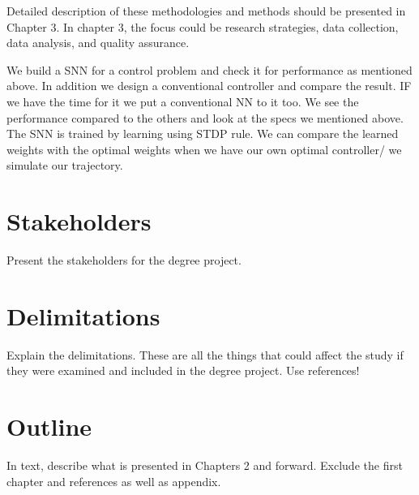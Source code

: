 Detailed description of these methodologies and methods should be presented in Chapter 3. In chapter 3, the focus could be research strategies, data collection, data analysis, and quality assurance.


We build a SNN for a control problem and check it for performance as mentioned above. In addition we design a conventional controller and compare the result. IF we have the time for it we put a conventional NN to it too. We see the performance compared to the others and look at the specs we mentioned above.
The SNN is trained by learning using STDP rule. We can compare the learned weights with the optimal weights when we have our own optimal controller/ we simulate our trajectory.

\section{Stakeholders}
Present the stakeholders for the degree project.

\section{Delimitations}
Explain the delimitations. These are all the things that could affect the study if they were examined and included in the degree project.
Use references!

\section{Outline}
In text, describe what is presented in Chapters 2 and forward. Exclude the first chapter and references as well as appendix.
